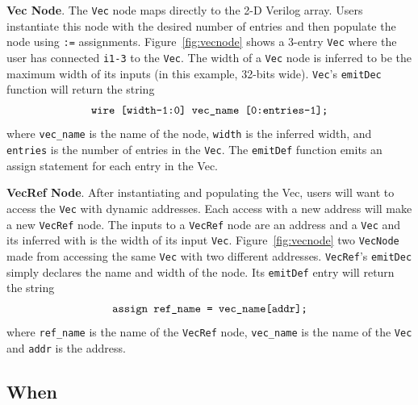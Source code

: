 \textbf{Vec Node}. The {\tt Vec} node maps directly to the 2-D Verilog
array. Users instantiate this node with the desired number of entries
and then populate the node using {\tt :=}
assignments. Figure~\ref{fig:vecnode} shows a 3-entry {\tt Vec} where
the user has connected {\tt i1-3} to the {\tt Vec}. The width of a
{\tt Vec} node is inferred to be the maximum width of its inputs (in
this example, 32-bits wide). {\tt Vec}'s {\tt emitDec} function will
return the string
\begin{align*}
\centering
\text{\tt{wire [width-1:0] vec\_name [0:entries-1];}}
\end{align*}
where {\tt vec\_name} is the name of the node, {\tt width} is the
inferred width, and {\tt entries} is the number of entries in the
{\tt Vec}. The {\tt emitDef} function emits an assign statement for
each entry in the Vec.

\textbf{VecRef Node}. After instantiating and populating the Vec,
users will want to access the {\tt Vec} with dynamic addresses. Each
access with a new address will make a new {\tt VecRef} node. The
inputs to a {\tt VecRef} node are an address and a 
{\tt Vec} and its inferred with is the width of its input
{\tt Vec}. Figure~\ref{fig:vecnode} two {\tt VecNode} made from
accessing the same {\tt Vec} with two different addresses. 
{\tt VecRef}'s {\tt emitDec} simply declares the name and width of the
node. Its {\tt emitDef} entry will return the string
\begin{align*}
\centering
\text{\tt{assign ref\_name = vec\_name[addr];}}
\end{align*}
where {\tt ref\_name} is the name of the {\tt VecRef} node, 
{\tt vec\_name} is the name of the {\tt Vec} and {\tt addr} is the
address.
\subsection{When}
